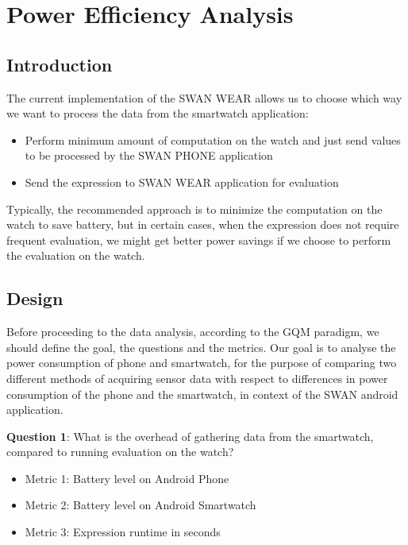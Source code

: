 
\chapter{Power Efficiency Analysis} %

\label{Chapter6} %



\section{Introduction}
The current implementation of the SWAN WEAR allows us to choose which way we want to process the data from the smartwatch application:
\begin{itemize}
 \item Perform minimum amount of computation on the watch and just send values to be processed by the SWAN PHONE application
 \item Send the expression to SWAN WEAR application for evaluation
\end{itemize}

Typically, the recommended approach is to minimize the computation on the watch to save battery, but in certain cases,  when the expression does not require frequent evaluation, we might get better power savings if we choose to perform the evaluation on the watch.

\section{Design}
Before proceeding to the data analysis, according to the GQM\cite{gqm_1}\cite{gqm_2} paradigm, we should define the goal, the questions and the metrics.
    Our goal is to analyse the power consumption of phone and smartwatch, for the purpose of comparing two different methods of acquiring sensor data
    with respect to differences in power consumption of the phone and the smartwatch, in context of the SWAN android application.

\textbf{Question 1}: What is the overhead of gathering data from the smartwatch, compared to running evaluation on the watch?
\begin{itemize}
  \item Metric 1:  Battery level on Android Phone
  \item Metric 2:  Battery level on Android Smartwatch
  \item  Metric 3:  Expression runtime in seconds
\end{itemize}

